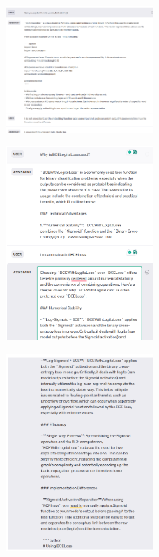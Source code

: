 \documentclass{article}
\begin{document}
\begin{figure}[H]
    \centering
    \includegraphics[width=0.5\textwidth]{report_data/g-9.png}
\end{figure}

\begin{figure}[H]
    \centering
    \includegraphics[width=0.5\textwidth]{report_data/g-10.png}
\end{figure}

\begin{figure}[H]
    \centering
    \includegraphics[width=0.5\textwidth]{report_data/g-11.png}
\end{figure}
\end{document}
